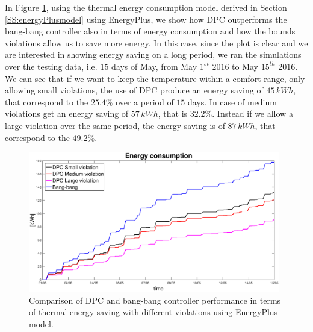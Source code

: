 In Figure \ref{F:comparison_all_energy_E+}, using the thermal energy consumption model derived in Section \ref{SS:energyPlusmodel} using EnergyPlus, we show how DPC outperforms the bang-bang controller also in terms of energy consumption and how the bounds violations allow us to save more energy. In this case, since the plot is clear and we are interested in showing energy saving on a long period, we ran the simulations over the testing data, i.e. $15$ days of May, from May $1^{st}$ $2016$ to May $15^{th}$ $2016$. We can see that if we want to keep the temperature within a comfort range, only allowing small violations, the use of DPC produce an energy saving of $45\, kWh$, that correspond to the $25.4\%$ over a period of $15$ days. In case of medium violations get an energy saving of $57\, kWh$, that is $32.2\%$. Instead if we allow a large violation over the same period, the energy saving is of $87\, kWh$, that correspond to the $49.2\%$.
\begin{figure}[h!]
	\begin{center}
		\includegraphics[width=26pc]{figures/Energy_all_EnergyPlus.eps}
	\end{center}
	\caption{Comparison of DPC and bang-bang controller performance in terms of thermal energy saving with different violations using EnergyPlus model.}
	\label{F:comparison_all_energy_E+}
\end{figure}






